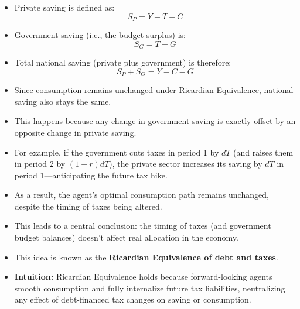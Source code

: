 \documentclass[12pt]{article}
\begin{document}
\begin{itemize}
\item Private saving is defined as:
\[
S_P = Y - T - C
\]

\item Government saving (i.e., the budget surplus) is:
\[
S_G = T - G
\]

\item Total national saving (private plus government) is therefore:
\[
S_P + S_G = Y - C - G
\]

\item Since consumption remains unchanged under Ricardian Equivalence, national saving also stays the same.

\item This happens because any change in government saving is exactly offset by an opposite change in private saving.

\item For example, if the government cuts taxes in period 1 by $dT$ (and raises them in period 2 by $(1 + r)dT$), the private sector increases its saving by $dT$ in period 1—anticipating the future tax hike.

\item As a result, the agent’s optimal consumption path remains unchanged, despite the timing of taxes being altered.

\item This leads to a central conclusion: the timing of taxes (and government budget balances) doesn’t affect real allocation in the economy.

\item This idea is known as the \textbf{Ricardian Equivalence of debt and taxes}.

\item \textbf{Intuition:} Ricardian Equivalence holds because forward-looking agents smooth consumption and fully internalize future tax liabilities, neutralizing any effect of debt-financed tax changes on saving or consumption.
\end{itemize}
\end{document}
